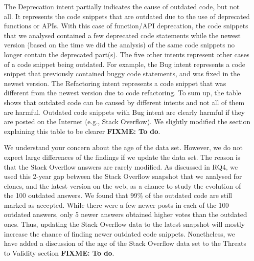 \documentclass[a4paper,twoside,10pt]{reviewresponse}
\newcommand\FIXME[1]{{\color{red}\textbf{FIXME: #1}}}
\begin{document}
The Deprecation intent partially indicates the cause of outdated code, but not all. It represents the code snippets that are outdated due to the use of deprecated functions or APIs. With this case of function/API deprecation, the code snippets that we analysed contained a few deprecated code statements while the newest version (based on the time we did the analysis) of the same code snippets no longer contain the deprecated part(s). The five other intents represent other cases of a code snippet being outdated. For example, the Bug intent represents a code snippet that previously contained buggy code statements, and was fixed in the newest version. The Refactoring intent represents a code snippet that was different from the newest version due to code refactoring.
To sum up, the table shows that outdated code can be caused by different intents and not all of them are harmful. Outdated code snippets with Bug intent are clearly harmful if they are posted on the Internet (e.g., Stack Overflow). We slightly modified the section explaining this table to be clearer \FIXME{To do}.


We understand your concern about the age of the data set. However, we do not expect large differences of the findings if we update the data set. The reason is that the Stack Overflow answers are rarely modified. As discussed in RQ4, we used this 2-year gap between the Stack Overflow snapshot that we analysed for clones, and the latest version on the web, as a chance to study the evolution of the 100 outdated answers. We found that 99\% of the outdated code are still marked as accepted. While there were a few newer posts in each of the 100 outdated answers, only 5 newer answers obtained higher votes than the outdated ones. Thus, updating the Stack Overflow data to the latest snapshot will mostly increase the chance of finding newer outdated code snippets.
Nonetheless, we have added a discussion of the age of the Stack Overflow data set to the Threats to Validity section \FIXME{To do}.
\end{document}
